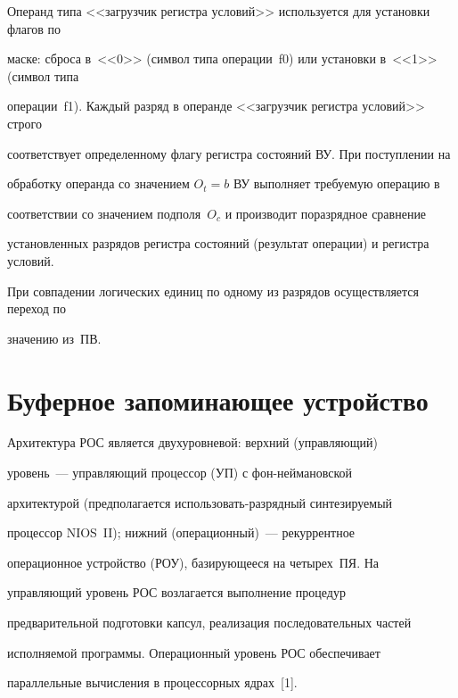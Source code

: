       


Операнд типа <<загрузчик регистра условий>> используется для установки флагов по 


маске: сброса в~<<0>> (символ типа операции~f0) или установки в~<<1>> (символ типа 


операции~f1). Каждый разряд в операнде <<загрузчик регистра условий>> строго 


соответствует определенному флагу регистра состояний ВУ. При поступлении на 


обработку операнда со значением $O_t=b$ ВУ выполняет требуемую операцию в 


соответствии со значением подполя~$O_c$ и производит поразрядное сравнение 


установленных разрядов регистра состояний (результат операции) и регистра условий. 


При совпадении логических единиц по одному из разрядов осуществляется переход по 


значению из~ПВ.


      


\section{Буферное запоминающее устройство}


      


      Архитектура РОС является двухуровневой: верхний (управ\-ля\-ющий) 


уровень~--- управляющий процессор (УП) с фон-\linebreak ней\-ма\-нов\-ской 


архитектурой (предполагается использовать-раз\-ряд\-ный синтезируемый 


процессор NIOS~II); нижний (операционный)~--- рекуррентное 


операционное устройство (РОУ), базирующееся на четырех~ПЯ. На 


управляющий уровень РОС возлагается выполнение процедур 


предварительной подготовки капсул, реализация последовательных частей 


исполняемой программы. Операционный уровень РОС обеспечивает 


параллельные вычисления в процессорных ядрах~[1].


      


